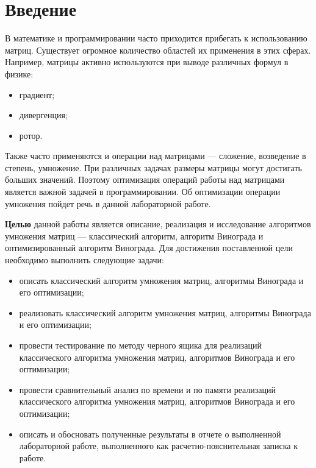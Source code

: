 \chapter*{Введение}

В математике и программировании часто приходится прибегать к использованию матриц. Существует огромное количество областей их применения в этих сферах. Например, матрицы активно используются при выводе различных формул в физике:

\begin{itemize}[label=---]
	\item градиент;
	\item дивергенция;
	\item ротор.
\end{itemize}

Также часто применяются и операции над матрицами --- сложение, возведение в степень, умножение. При различных задачах размеры матрицы могут достигать больших значений. Поэтому оптимизация операций работы над матрицами является важной задачей в программировании. Об оптимизации операции умножения пойдет речь в данной лабораторной работе.

\textbf{Целью} данной работы является описание, реализация и исследование алгоритмов умножения матриц --- классический алгоритм, алгоритм Винограда и оптимизированный алгоритм Винограда. Для достижения поставленной цели необходимо выполнить следующие задачи:

\begin{itemize}[label=---]
	\item описать классический алгоритм умножения матриц, алгоритмы Винограда и его оптимизации;
	
	\item реализовать классический алгоритм умножения матриц, алгоритмы Винограда и его оптимизации;
	
	\item провести тестирование по методу черного ящика для реализаций классического алгоритма умножения матриц, алгоритмов Винограда и его оптимизации;
	
	\item провести сравнительный анализ по времени и по памяти реализаций классического алгоритма умножения матриц, алгоритмов Винограда и его оптимизации;
	
	\item описать и обосновать полученные результаты в отчете о выполненной лабораторной работе, выполненного как расчетно-пояснительная записка к работе.
\end{itemize}